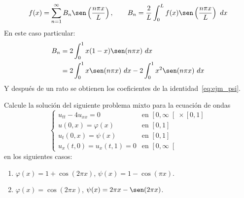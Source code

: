 \begin{ejemplo}
\begin{enumerate}[label=\alph*)]
\begin{equation*}
                f(x) = \sum_{n=1}^{\infty} B_n \sen\left(\frac{n\pi x}{L}\right), \qquad B_n = \frac{2}{L}\int_{0}^{L} f(x)\sen\left(\frac{n\pi x}{L}\right)~dx 
            \end{equation*}
            En este caso particular:
            \begin{align*}
                B_n &= 2\int_{0}^{1} x(1-x)\sen(n\pi x)~dx  \\
                    &= 2\int_{0}^{1} x\sen(n\pi x)~dx  - 2\int_{0}^{1} x^2\sen(n\pi x)~dx 
            \end{align*}
            Y después de un rato se obtienen los coeficientes de la identidad~\eqref{eq:ejm_psi}.
    \end{enumerate}
\end{ejemplo}

\begin{ejemplo} %
    Calcule la solución del siguiente problema mixto para la ecuación de ondas
    \begin{equation*}
        \left\{\begin{array}{ll}
                u_{tt} - 4u_{xx} = 0  & \text{en\ } \left[0,\infty\right[\times[0,1] \\
                    u(0,x) = \varphi(x) &\text{en\ } [0,1] \\
                    u_t(0,x) = \psi(x) &\text{en\ } [0,1] \\
                    u_x(t,0) = u_x(t,1) = 0 & \text{en\ } \left[0,\infty\right[
        \end{array}\right.
    \end{equation*}
    en los siguientes casos:
    \begin{enumerate}[label=\alph*)]
        \item $\varphi(x) = 1+\cos(2\pi x)$, $\psi(x) = 1-\cos(\pi x)$.
        \item $\varphi(x) = \cos(2\pi x)$, $\psi(x) = 2\pi x- \sen(2\pi x)$.
    \end{enumerate}~\\


\end{ejemplo}
